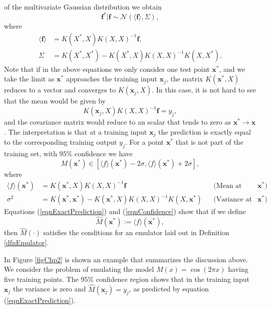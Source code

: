\documentclass{sfuthesis}
\newcommand{\x}{\textbf{x}}
\begin{document}
of the multivariate Gaussian distribution we  obtain  \cite{lifshits2013gaussian}
\begin{equation}\label{eqnformulameancovariance}
\textbf{f}^{*}|\textbf{f}\sim\mathscr{N}(\langle\textbf{f}\rangle,\Sigma),
\end{equation}
where
\begin{align*}
\langle\textbf{f}\rangle&=K(X^{*},X)K(X,X)^{-1}\textbf{f},\\
\Sigma&=K(X^{*},X^{*})-K(X^{*},X)K(X,X)^{-1}K(X,X^{*}).
\end{align*}
Note that  if in the above equations we only consider one  test point $\x^{*}$, and
we take the limit as $\x^{*}$ approaches   the training input $\x_{j}$,
 the matrix
$K(\x^{*},X)$ reduces to a vector and  converges to  $K(\x_{j},X)$. In this case, it is not hard 
to see that the mean
would be given by 
\begin{equation}\label{eqnExactPrediction}
K(\x_{j},X)K(X,X)^{-1}\textbf{f}=y_{j},
\end{equation} 
and the covariance matrix would 
reduce to an scalar  that tends to zero as $\x^{*}\rightarrow \x$. The interpretation is that 
at a training input $\x_{j}$ the prediction is exactly equal to the  corresponding training output $y_{j}$. 
For a point $\textbf{x}^{*}$ that is not part of the training set, with $95\%$ confidence we have
\begin{equation}\label{eqnConfidence}
M(\x^{*})\in [\langle f \rangle(\x^{*})-2\sigma,\langle f\rangle(\x^{*})+2\sigma],
\end{equation}
where
\begin{align*}
\langle f\rangle(\x^{*})&=K(\textbf{x}^{*},X)K(X,X)^{-1}\textbf{f}&&\text{(Mean at point $\x^{*}$)}  \\
\sigma^{2}&=K(\textbf{x}^{*},\textbf{x}^{*})-
K(\textbf{x}^{*},X)K(X,X)^{-1}K(X,\textbf{x}^{*}) &&\text{(Variance at point $\x^{*}$)}.
\end{align*}
Equations (\ref{eqnExactPrediction}) and (\ref{eqnConfidence})  show that if we define 
\begin{equation}\label{eqnDefEmulator}
\widehat{M}(\x^{*}):=\langle f\rangle(\x^{*}), 
\end{equation}
then $\widehat{M}(\cdot)$ satisfies the 
conditions for an emulator laid out in Definition \ref{dfnEmulator}.

In Figure \ref{figChp2} is shown an example that summarizes the discussion above.
We consider the problem of emulating the model $M(x)=\cos(2\pi x)$
having five training points. The 95\% confidence region
shows that in the training input $\x_{j}$  the variance is zero  and $\widehat{M}(\x_{j})=y_{j}$, 
as predicted by equation (\ref{eqnExactPrediction}).
\newline
\end{document}

